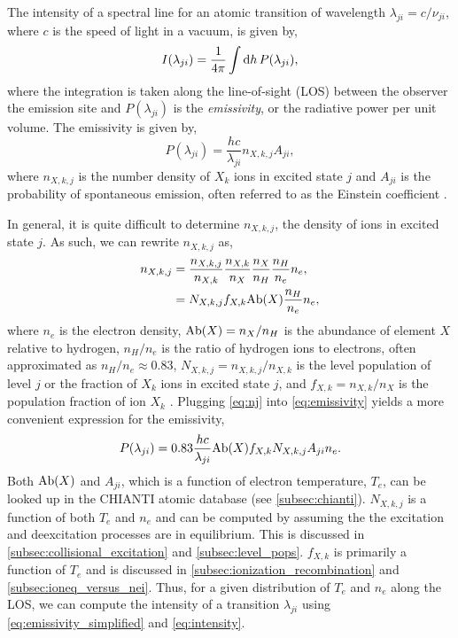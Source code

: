 The intensity of a spectral line for an atomic transition of wavelength $\lambda_{ji}=c/\nu_{ji}$, where $c$ is the speed of light in a vacuum, is given by,
\begin{equation}\label{eq:intensity}
    I(\lambda_{ji}) = \frac{1}{4\pi}\int\textup{d}h\,P(\lambda_{ji}),
\end{equation}
where the integration is taken along the line-of-sight (LOS) between the observer the emission site and $P(\lambda_{ji})$ is the \textit{emissivity}, or the radiative power per unit volume. The emissivity is given by,
\begin{equation}\label{eq:emissivity}
    P(\lambda_{ji}) = \frac{hc}{\lambda_{ji}}n_{X,k,j}A_{ji},
\end{equation}
where $n_{X,k,j}$ is the number density of $X_k$ ions in excited state $j$ and $A_{ji}$ is the probability of spontaneous emission, often referred to as the Einstein coefficient \citep{bradshaw_collisional_2013,del_zanna_solar_2018}.

In general, it is quite difficult to determine $n_{X,k,j}$, the density of ions in excited state $j$. As such, we can rewrite $n_{X,k,j}$ as,
\begin{align}\label{eq:nj}
    n_{X,k,j} &= \frac{n_{X,k,j}}{n_{X,k}}\frac{n_{X,k}}{n_X}\frac{n_X}{n_H}\frac{n_H}{n_e}n_e, \nonumber\\
              &= N_{X,k,j}f_{X,k}\textup{Ab}(X)\frac{n_H}{n_e}n_e,
\end{align}
where $n_e$ is the electron density, $\textup{Ab}(X)=n_X/n_H$ is the abundance of element $X$ relative to hydrogen, $n_H/n_e$ is the ratio of hydrogen ions to electrons, often approximated as $n_H/n_e\approx0.83$, $N_{X,k,j}=n_{X,k,j}/n_{X,k}$ is the level population of level $j$ or the fraction of $X_k$ ions in excited state $j$, and $f_{X,k}=n_{X,k}/n_X$ is the population fraction of ion $X_k$ \citep{del_zanna_solar_2018}. Plugging \autoref{eq:nj} into \autoref{eq:emissivity} yields a more convenient expression for the emissivity,
\begin{equation}\label{eq:emissivity_simplified}
    P(\lambda_{ji}) = 0.83\frac{hc}{\lambda_{ji}}\textup{Ab}(X)f_{X,k}N_{X,k,j}A_{ji}n_e.
\end{equation}
Both $\textup{Ab}(X)$ and $A_{ji}$, which is a function of electron temperature, $T_e$, can be looked up in the CHIANTI atomic database (see \autoref{subsec:chianti}). $N_{X,k,j}$ is a function of both $T_e$ and $n_e$ and can be computed by assuming the the excitation and deexcitation processes are in equilibrium. This is discussed in \autoref{subsec:collisional_excitation} and \autoref{subsec:level_pops}. $f_{X,k}$ is primarily a function of $T_e$ and is discussed in \autoref{subsec:ionization_recombination} and \autoref{subsec:ioneq_versus_nei}. Thus, for a given distribution of $T_e$ and $n_e$ along the LOS, we can compute the intensity of a transition $\lambda_{ji}$ using \autoref{eq:emissivity_simplified} and \autoref{eq:intensity}.

